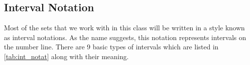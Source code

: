 \subsection{Interval Notation}
Most of the sets that we work with in this class will be written in a
style known as interval notations. As the name suggests, this notation
represents intervals on the number line. There are 9 basic types of
intervals which are listed in \cref{tab:int_notat} along with their
meaning.

\begin{table}[h]
	\centering
	\renewcommand{\arraystretch}{1.5}
	\def\myNumlineVOffset{-0.75\height}
	\newlength{\myRadius}
	\setlength{\myRadius}{2pt}
	\begin{tabular}{>{\centering}m{5em}ccp{13.5em}}
	

\end{tabular}
\end{table}
